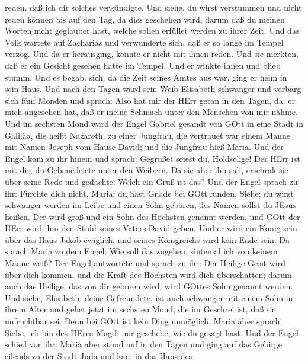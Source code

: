 reden, daß ich dir solches verkündigte.  Und siehe, du
wirst verstummen und nicht reden können bis auf den Tag, da dies
geschehen wird, darum daß du meinen Worten nicht geglaubet hast, welche
sollen erfüllet werden zu ihrer Zeit.  Und das Volk wartete
auf Zacharias und verwunderte sich, daß er so lange im Tempel verzog.
 Und da er herausging, konnte er nicht mit ihnen reden. Und
sie merkten, daß er ein Gesicht gesehen hatte im Tempel. Und er winkte
ihnen und blieb stumm.  Und es begab. sich, da die Zeit
seines Amtes aus war, ging er heim in sein Haus.  Und nach
den Tagen ward sein Weib Elisabeth schwanger und verbarg sich fünf
Monden und sprach:  Also hat mir der HErr getan in den
Tagen, da. er mich angesehen hat, daß er meine Schmach unter den
Menschen von mir nähme.  Und im sechsten Mond ward der
Engel Gabriel gesandt von GOtt in eine Stadt in Galiläa, die heißt
Nazareth,  zu einer Jungfrau, die vertrauet war einem Manne
mit Namen Joseph vom Hause David; und die Jungfrau hieß Maria.
 Und der Engel kam zu ihr hinein und sprach: Gegrüßet
seiest du, Holdselige! Der HErr ist mit dir, du Gebenedeiete unter den
Weibern.  Da sie aber ihn sah, erschrak sie über seine Rede
und gedachte: Welch ein Gruß ist das?  Und der Engel sprach
zu ihr: Fürchte dich nicht, Maria; du hast Gnade bei GOtt funden.
 Siehe; du wirst schwanger werden im Leibe und einen Sohn
gebären, des Namen sollst du JEsus heißen.  Der wird groß
und ein Sohn des Höchsten genannt werden, und GOtt der HErr wird ihm den
Stuhl seines Vaters David geben.  Und er wird ein König
sein über das Haus Jakob ewiglich, und seines Königreichs wird kein Ende
sein.  Da sprach Maria zu dem Engel: Wie soll das zugehen,
sintemal ich von keinem Manne weiß?  Der Engel antwortete
und sprach zu ihr: Der Heilige Geist wird über dich kommen, und die
Kraft des Höchsten wird dich überschatten; darum auch das Heilige, das
von dir geboren wird, wird GOttes Sohn genannt werden.  Und
siehe, Elisabeth, deine Gefreundete, ist auch schwanger mit einem Sohn
in ihrem Alter und gehet jetzt im sechsten Mond, die im Geschrei ist,
daß sie unfruchtbar sei.  Denn bei GOtt ist kein Ding
unmöglich.  Maria aber sprach: Siehe, ich bin des HErrn
Magd; mir geschehe, wie du gesagt hast. Und der Engel schied von ihr.
 Maria aber stund auf in den Tagen und ging auf das Gebirge
eilends zu der Stadt Juda  und kam in das Haus des
